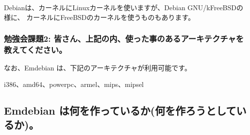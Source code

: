 \documentclass[mingoth,a4paper]{jsarticle}
\begin{document}
Debianは、カーネルにLinuxカーネルを使いますが、Debian GNU/kFreeBSDの様に、
カーネルにFreeBSDのカーネルを使うものもあります。

\subsubsection{勉強会課題2: 皆さん、上記の内、使った事のあるアーキテクチャを教えてください。}

なお、Emdebian は、下記のアーキテクチャが利用可能です。

i386、amd64、powerpc、armel、mips、mipsel

\subsection{Emdebian は何を作っているか(何を作ろうとしているか)。}
\end{document}
